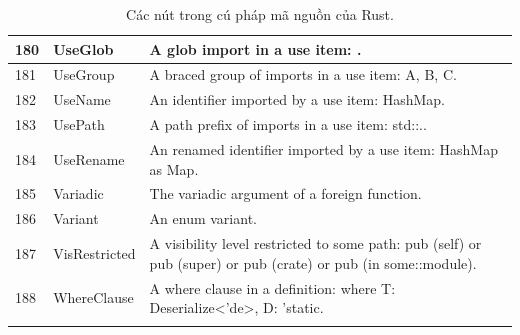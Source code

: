 \begin{longtable}{| p{} | p{} | p{} |}
180   & UseGlob                        & A glob import in a use item: \*.                                                                               \\ \hline
181   & UseGroup                       & A braced group of imports in a use item: {A, B, C}.                                                            \\ \hline
182   & UseName                        & An identifier imported by a use item: HashMap.                                                                 \\ \hline
183   & UsePath                        & A path prefix of imports in a use item: std::..                                                                \\ \hline
184   & UseRename                      & An renamed identifier imported by a use item: HashMap as Map.                                                  \\ \hline
185   & Variadic                       & The variadic argument of a foreign function.                                                                   \\ \hline
186   & Variant                        & An enum variant.                                                                                               \\ \hline
187   & VisRestricted                  & A visibility level restricted to some path: pub (self) or pub (super) or pub (crate) or pub (in some::module). \\ \hline
188   & WhereClause                    & A where clause in a definition: where T: Deserialize<'de>, D: 'static.                                         \\ \hline
\caption{Các nút trong cú pháp mã nguồn của Rust.}
\label{table:c3s_nodeastrust}
\end{longtable}
\medskip